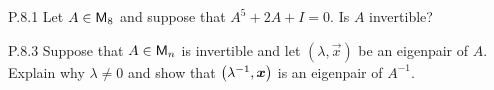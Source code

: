 \documentclass{../homework}
\begin{document}
\begin{problems}
\item[P.8.1] Let \(A \in \mathsf{M}_8\) and suppose that \(A^5 + 2A + I = 0\).
  Is \(A\) invertible?

  \begin{solution}

  \end{solution}

\item[P.8.3] Suppose that \(A \in \mathsf{M}_n\) is invertible and let
  \((\lambda, \vec x)\) be an eigenpair of \(A\).  Explain why
  \(\lambda \ne 0\) and show that \(\Paren{\lambda^{-1}, \vec x}\) is
  an eigenpair of \(A^{-1}\).

  \begin{solution}

  \end{solution}
\end{problems}
\end{document}
